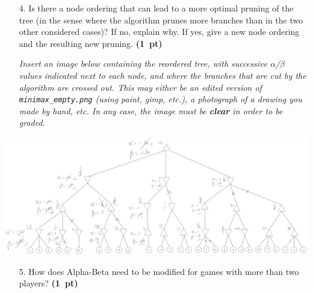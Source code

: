 \documentclass[11pt,a4paper]{report}
\begin{document}
\clearpage
\begin{enumerate}
\item[4.] Is there a node ordering that can lead to a more optimal pruning of the tree
(in the sense where the algorithm prunes more branches than in the two other
considered cases)? If no, explain why. If yes, give a new node ordering and the
resulting new pruning.  \textbf{(1~pt)}
      
      \textit{Insert an image below containing the reordered tree, with successive $\alpha$/$\beta$ values indicated next to each node, and where the branches that are cut by the algorithm are crossed out. This may either be an edited version of \texttt{minimax\_empty.png} (using paint, gimp, etc.), a photograph of a drawing you made by hand, etc. In any case, the image must be \textbf{clear} in order to be graded.}
\end{enumerate}

\begin{answers}[8cm]
\includegraphics[scale=.4]{images/optimal_ordering_q4.png}
\end{answers}




\begin{enumerate}
\item[5.] How does Alpha-Beta need to be modified for games with more than two players? \textbf{(1~pt)}
\end{enumerate}
\end{document}
